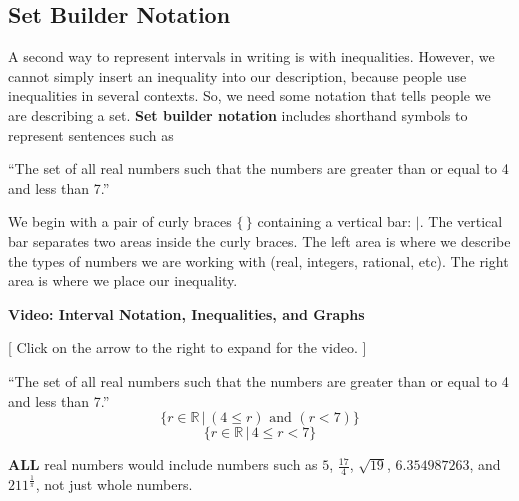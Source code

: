 \documentclass{ximera}
\begin{document}
\subsection*{Set Builder Notation}

A second way to represent intervals in writing is with inequalities. However, we cannot simply insert an inequality into our description, because people use inequalities in several contexts.  So, we need some notation that tells people we are describing a set. \textbf{Set builder notation} includes shorthand symbols to represent sentences such as 

\begin{center}
``The set of all real numbers such that the numbers are greater than or equal to 4 and less than 7.''
\end{center}

We begin with a pair of curly braces $\{  \, \}$ containing a vertical bar:  ${|}$.  The vertical bar separates two areas inside the curly braces. The left area is where we describe the types of numbers we are working with (real, integers, rational, etc).  The right area is where we place our inequality.





\begin{explanation} \textbf{Video: Interval Notation, Inequalities, and Graphs}

[ Click on the arrow to the right to expand for the video. ]
\begin{expandable} 

\begin{center}
\end{center}

\end{expandable}
\end{explanation}





\begin{example}
``The set of all real numbers such that the numbers are greater than or equal to 4 and less than 7.''
\[ \{ r \in \mathbb {R} \, | \, (4 \leq r)  \text{ and } (r < 7) \} \]
\[ \{ r \in \mathbb {R} \, | \, 4 \leq r < 7 \} \]

\begin{warning}
\textbf{ALL} real numbers would include numbers such as $5$, $\frac{17}{4}$, $\sqrt{19}$, $6.354987263$, and $211^{\tfrac{1}{\pi}}$, not just whole numbers.
\end{warning}
\end{example}
\end{document}
